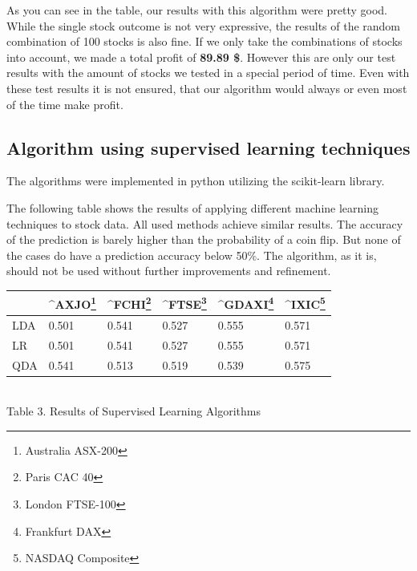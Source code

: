 \documentclass[conference]{IEEEtran}
\begin{document}
As you can see in the table, our results with this algorithm were pretty good. While the single stock outcome is not very expressive, the results of the random combination of 100 stocks is also fine. If we only take the combinations of stocks into account, we made a total profit of \textbf{89.89 \$}. However this are only our test results with the amount of stocks we tested in a special period of time. Even with these test results it is not ensured, that our algorithm would always or even most of the time make profit.

\subsection{Algorithm using supervised learning techniques}

The algorithms were implemented in python utilizing the scikit-learn library.

The following table shows the results of applying different machine learning techniques to stock data. All used methods achieve similar results. The accuracy of the prediction is barely higher than the probability of a coin flip. But none of the cases do have a prediction accuracy below 50\%. The algorithm, as it is, should not be used without further improvements and refinement. 

\begin{center}
\begin{tabularx}{0.5\textwidth}{|X|X|X|X|X|X|}
\hline
{} &     
\^{}AXJO\footnote{Australia ASX-200} &     
\^{}FCHI\footnote{Paris CAC 40} &     
\^{}FTSE\footnote{London FTSE-100} &    
\^{}GDAXI\footnote{Frankfurt DAX} & 
\^{}IXIC\footnote{NASDAQ Composite}\\
\hline
LDA &  0.501 &  0.541 &  0.527 &  0.555 & 0.571\\
LR  &  0.501 &  0.541 &  0.527 &  0.555 & 0.571\\
QDA &  0.541 &  0.513 &  0.519 &  0.539 & 0.575\\
\hline
\end{tabularx}
\\[5pt]
Table 3. Results of Supervised Learning Algorithms
\end{center}

\end{document}

